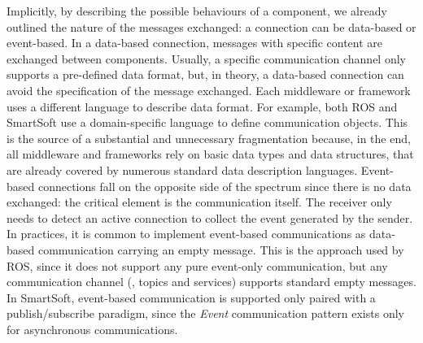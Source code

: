 \bigskip

Implicitly, by describing the possible behaviours of a component, we already outlined the nature of the messages exchanged: a connection can be data-based or event-based. In a data-based connection, messages with specific content are exchanged between components. Usually, a specific communication channel only supports a pre-defined data format, but, in theory, a data-based connection can avoid the specification of the message exchanged. Each middleware or framework uses a different language to describe data format. For example, both ROS  and SmartSoft use a domain-specific language to define communication objects. This is the source of a substantial and unnecessary fragmentation because, in the end, all middleware and frameworks rely on basic data types and data structures, that are already covered by numerous standard data description languages. Event-based connections fall on the opposite side of the spectrum since there is no data exchanged: the critical element is the communication itself. The receiver only needs to detect an active connection to collect the event generated by the sender. In practices, it is common to implement event-based communications as data-based communication carrying an empty message. This is the approach used by ROS, since it does not support any pure event-only communication, but any communication channel (\ie, topics and services) supports standard empty messages. In SmartSoft, event-based communication is supported only paired with a publish/subscribe paradigm, since the \textit{Event} communication pattern exists only for asynchronous communications.

